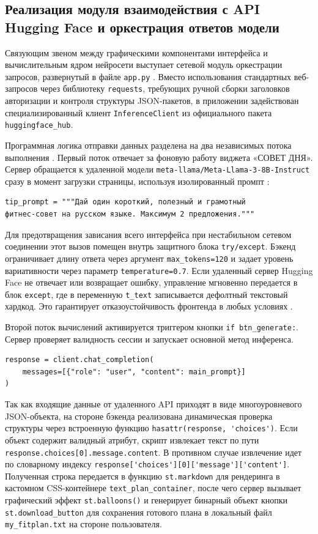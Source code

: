\documentclass[14pt, a4paper]{extarticle}
\begin{document}
\subsection{Реализация модуля взаимодействия с API Hugging Face и оркестрация ответов модели}

Связующим звеном между графическими компонентами интерфейса и вычислительным ядром нейросети выступает сетевой модуль оркестрации запросов, развернутый в файле \texttt{app.py} \cite{app.py}. Вместо использования стандартных веб-запросов через библиотеку \texttt{requests}, требующих ручной сборки заголовков авторизации и контроля структуры JSON-пакетов, в приложении задействован специализированный клиент \texttt{InferenceClient} из официального пакета \texttt{huggingface\_hub}.

Программная логика отправки данных разделена на два независимых потока выполнения \cite{app.py}. Первый поток отвечает за фоновую работу виджета «СОВЕТ ДНЯ». Сервер обращается к удаленной модели \texttt{meta-llama/Meta-Llama-3-8B-Instruct} сразу в момент загрузки страницы, используя изолированный промпт \cite{app.py}:
\begin{verbatim}
tip_prompt = """Дай один короткий, полезный и грамотный 
фитнес-совет на русском языке. Максимум 2 предложения."""
\end{verbatim}

Для предотвращения зависания всего интерфейса при нестабильном сетевом соединении этот вызов помещен внутрь защитного блока \texttt{try/except}. Бэкенд ограничивает длину ответа через аргумент \verb|max_tokens=120| и задает уровень вариативности через параметр \verb|temperature=0.7|. Если удаленный сервер Hugging Face не отвечает или возвращает ошибку, управление мгновенно передается в блок \texttt{except}, где в переменную \texttt{t\_text} записывается дефолтный текстовый хардкод. Это гарантирует отказоустойчивость фронтенда в любых условиях \cite{app.py}.

Второй поток вычислений активируется триггером кнопки \verb|if btn_generate:|. Сервер проверяет валидность сессии и запускает основной метод инференса.

\begin{verbatim}
response = client.chat_completion(
    messages=[{"role": "user", "content": main_prompt}]
)
\end{verbatim}

Так как входящие данные от удаленного API приходят в виде многоуровневого JSON-объекта, на стороне бэкенда реализована динамическая проверка структуры через встроенную функцию \verb|hasattr(response, 'choices')|. Если объект содержит валидный атрибут, скрипт извлекает текст по пути \verb|response.choices[0].message.content|. В противном случае извлечение идет по словарному индексу \verb|response['choices'][0]['message']['content']|. Полученная строка передается в функцию \verb|st.markdown| для рендеринга в кастомном CSS-контейнере \verb|text_plan_container|, после чего сервер вызывает графический эффект \verb|st.balloons()| и генерирует бинарный объект кнопки \verb|st.download_button| для сохранения готового плана в локальный файл \texttt{my\_fitplan.txt} на стороне пользователя.
\end{document}
